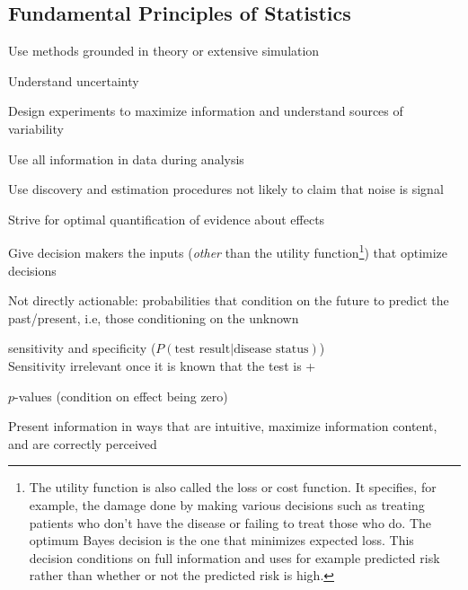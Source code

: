 \subsection{Fundamental Principles of Statistics}
\bi
\item Use methods grounded in theory or extensive simulation
\item Understand uncertainty
\item Design experiments to maximize information and understand
  sources of variability
\item Use all information in data during analysis
\item Use discovery and estimation procedures not likely to claim that
  noise is signal
\item Strive for optimal quantification of evidence about effects
\item Give decision makers the inputs (\emph{other} than the utility
  function\footnote{The utility function is also called the loss or
    cost function.  It specifies, for example, the damage done by
    making various decisions such as treating patients who don't have
    the disease or failing to treat those who do.  The optimum Bayes
    decision is the one that minimizes expected loss.  This decision
    conditions on full information and uses for example predicted risk
    rather than whether or not the predicted risk is high.}) that
  optimize decisions
  \bi
   \item Not directly actionable: probabilities that condition on the
     future to predict the past/present, i.e, those conditioning on
     the unknown
     \bi
     \item sensitivity and specificity ($P(\textrm{test result} |
       \textrm{disease status})$)\\
       Sensitivity irrelevant once it is known that the test is +
     \item $p$-values (condition on effect being zero)
     \ei
  \ei
\item Present information in ways that are intuitive, maximize
  information content, and are correctly perceived
\ei

